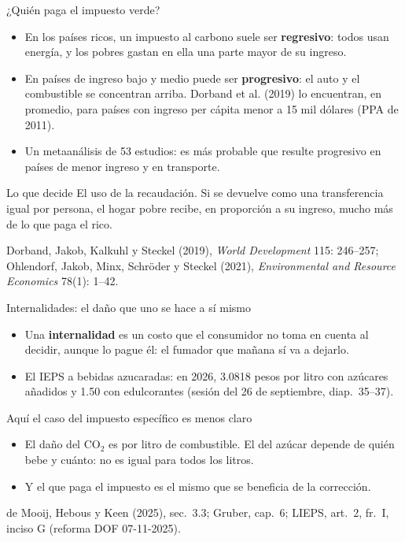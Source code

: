 \documentclass[aspectratio=169,11pt]{beamer}
\newcommand{\fuente}[1]{\par\vfill{\small\color{cGris}#1\par}}
\begin{document}
\begin{frame}{¿Quién paga el impuesto verde?}
  \begin{itemize}
    \item En los países ricos, un impuesto al carbono suele ser \textbf{regresivo}: todos usan energía, y los pobres gastan en ella una parte mayor de su ingreso.
    \pause
    \item En países de ingreso bajo y medio puede ser \textbf{progresivo}: el auto y el combustible se concentran arriba. Dorband et al. (2019) lo encuentran, en promedio, para países con ingreso per cápita menor a 15 mil dólares (PPA de 2011).
    \pause
    \item Un metaanálisis de 53 estudios: es más probable que resulte progresivo en países de menor ingreso y en transporte.
  \end{itemize}
  \pause
  \begin{block}{Lo que decide}
    El uso de la recaudación. Si se devuelve como una transferencia igual por persona, el hogar pobre recibe, en proporción a su ingreso, mucho más de lo que paga el rico.
  \end{block}
  \fuente{Dorband, Jakob, Kalkuhl y Steckel (2019), \emph{World Development} 115: 246--257; Ohlendorf, Jakob, Minx, Schröder y Steckel (2021), \emph{Environmental and Resource Economics} 78(1): 1--42.}
\end{frame}

\begin{frame}{Internalidades: el daño que uno se hace a sí mismo}
  \begin{itemize}
    \item Una \textbf{internalidad} es un costo que el consumidor no toma en cuenta al decidir, aunque lo pague él: el fumador que mañana sí va a dejarlo.
    \item El IEPS a bebidas azucaradas: en 2026, 3.0818 pesos por litro con azúcares añadidos y 1.50 con edulcorantes (sesión del 26 de septiembre, diap.~35--37).
  \end{itemize}
  \pause
  \begin{block}{Aquí el caso del impuesto específico es menos claro}
    \begin{itemize}
      \item El daño del CO$_2$ es por litro de combustible. El del azúcar depende de quién bebe y cuánto: no es igual para todos los litros.
      \item Y el que paga el impuesto es el mismo que se beneficia de la corrección.
    \end{itemize}
  \end{block}
  \fuente{de Mooij, Hebous y Keen (2025), sec.~3.3; Gruber, cap.~6; LIEPS, art.~2, fr.~I, inciso G (reforma DOF 07-11-2025).}
\end{frame}
\end{document}
